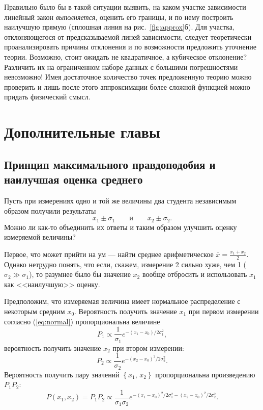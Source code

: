 \documentclass[10pt]{article}
\begin{document}
{\footnotesize{}Правильно было бы в такой ситуации выявить, на каком
участке зависимости линейный закон }\emph{\footnotesize{}выполняется}{\footnotesize{},
оценить его границы, и по нему построить наилучшую прямую (сплошная
линия на рис.~\ref{fig:approx}б). Для участка, отклоняющегося от
предсказываемой линей зависимости, следует теоретически проанализировать
причины отклонения и по возможности предложить уточнение теории. Возможно,
стоит ожидать не квадратичное, а кубическое отклонение? Различить
их на ограниченном наборе данных с большими погрешностями невозможно!
Имея достаточное количество точек предложенную теорию можно проверить
и лишь после этого аппроксимации более сложной функцией можно придать
физический смысл.}{\footnotesize\par}

\section{Дополнительные главы}

\subsection{{\small{}Принцип максимального правдоподобия и наилучшая оценка среднего}}

{\small{}Пусть при измерениях одно и той же величины два студента
независимым образом получили результаты 
\[
x_{1}\pm\sigma_{1}\qquad\text{и}\qquad x_{2}\pm\sigma_{2}.
\]
Можно ли как-то объединить их ответы и таким образом улучшить оценку
измеряемой величины?}{\small\par}

{\small{}Первое, что может прийти на ум --- найти среднее
арифметическое $\overline{x}=\frac{x_{1}+x_{2}}{2}.$ Однако нетрудно
понять, что если, скажем, измерение 2 сильно хуже, чем 1 ($\sigma_{2}\gg\sigma_{1}$),
то разумнее было бы значение $x_{2}$ вообще отбросить и использовать
$x_{1}$ как <<наилучшую>> оценку.}{\small\par}

{\small{}Предположим, что измеряемая величина имеет нормальное распределение
с некоторым средним $x_{0}$. Вероятность получить значение $x_{1}$
при первом измерении согласно (\ref{eq:normal}) пропорциональна величине
\[
P_{1}\propto\frac{1}{\sigma_{1}}e^{-\left(x_{1}-x_{0}\right)/2\sigma_{1}^{2}},
\]
вероятность получить значение $x_{2}$ при втором измерении:
\[
P_{2}\propto\frac{1}{\sigma_{2}}e^{-\left(x_{2}-x_{0}\right)^{2}/2\sigma_{2}^{2}}.
\]
Вероятность получить пару значений $\left\{ x_{1},\,x_{2}\right\} $
пропорциональна произведению $P_{1}P_{2}$:
\[
P\left(x_{1},x_{2}\right)=P_{1}P_{2}\propto\frac{1}{\sigma_{1}\sigma_{2}}e^{-\left(x_{1}-x_{0}\right)^{2}/2\sigma_{1}^{2}-\left(x_{2}-x_{0}\right)^{2}/2\sigma_{2}^{2}}.
\]
}{\small\par}
\end{document}
